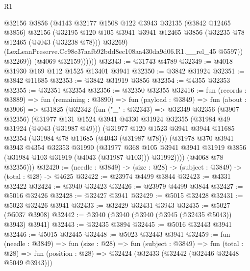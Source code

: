 \begin{lexlean}{R1}
\begin{coremodule}
                  @32156
                  @3856
                  (@4143
                    @32177
                    @1508
                    @122
                    @3943
                    @32135
                    (@3842 @12465 @3856)
                    @32156
                    (@32195
                      @120
                      @105
                      @3941
                      @3941
                      @12465
                      @3856
                      (@32235 @78 @12465 (@4043 (@32238 @78)))
                      @32269)
                    (LexLeanPreserve.Cc98c37aafb92bdd8ec108aa430da9d06.R1.__rel_45 @5597))
                  @32269))
              (@4069 @32159))))))
@32343 := @31743 @4789
@32349 := @4018 @31930 @169 @112 @1525 @13401 @3941
@32350 := @3842 @31924
@32351 := @3842 @11685
@32353 := @3842 @31919 @3856
@32354 := @4355 @32353
@32355 := @32351 @32354
@32356 := @32350 @32355
@32416 := fun (records : @3889) =>
  fun (remaining : @3890) =>
  fun (payload : @3849) =>
  fun (about : @3906) =>
  @31825
    (@32342
      (fun ("_" : @32343) =>
      @32349
        @32356
        (@3907 @32356)
        (@31977
          @131
          @1524
          @3941
          @4330
          @31924
          @32355
          (@31984 @49 @31924 (@4043 (@31987 @49)))
          (@31977
            @120
            @1523
            @3941
            @3944
            @11685
            @32354
            (@31984 @78 @11685 (@4043 (@31987 @78)))
            (@31978
              @370
              @3941
              @3943
              @4354
              @32353
              @31990
              (@31977
                @368
                @105
                @3941
                @3941
                @31919
                @3856
                (@31984 @103 @31919 (@4043 (@31987 @103)))
                @31992))))
        (@4068 @78 @32356)))
@32420 := (needle : @3849) -> (size : @28) -> (subject : @3849) -> (total : @28) -> @4625
@32422 := @23974 @4499 @3844
@32423 := @4331 @32422
@32424 := @3940 @32423
@32426 := @23979 @4499 @3844
@32427 := @5016 @32426
@32428 := @32427 @3941
@32429 := @5015 @32428
@32431 := @5023 @32426 @3941
@32433 := @32429 @32431 @3943
@32435 := @5027 (@5037 @3908)
@32442 := @3940 (@3940 (@3940 (@3945 (@32435 @5043)) @3943) @3941)
@32443 := @32435 @3894
@32445 := @5016 @32443 @3941
@32446 := @5015 @32445
@32448 := @5023 @32443 @3941
@32459 := fun (needle : @3849) =>
  fun (size : @28) =>
  fun (subject : @3849) =>
  fun (total : @28) => fun (position : @28) => @32424 (@32433 (@32442 (@32446 @32448 @5049 @3943)))

\end{coremodule}
\end{lexlean}
